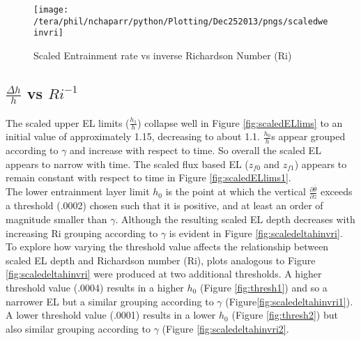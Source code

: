 \begin{figure}[htbp]
\centering
       \texttt{[image: /tera/phil/nchaparr/python/Plotting/Dec252013/pngs/scaledweinvri]}
       
        \caption{Scaled Entrainment rate vs inverse Richardson Number (\acs{Ri})}
        \label{fig:scaledweinvri}
\end{figure}

\clearpage

\subsection{$\frac{\Delta h}{h}$ vs $Ri^{-1}$}
\label{subsec:deltahri}
\FloatBarrier

The scaled upper EL limits ($\frac{h_{1}}{h}$) collapse well in Figure \ref{fig:scaledELlims} 
to an initial value of approximately 1.15, decreasing to about 1.1.  $\frac{h_{0}}{h}$s appear 
grouped according to $\gamma$ and increase with respect to time.  So overall the scaled \acs{EL} appears
to narrow with time.   The scaled flux based \acs{EL} ($z_{f0}$ and $z_{f1}$) appears to remain constant 
with respect to time in Figure \ref{fig:scaledELlims1}.\\

The lower entrainment layer limit $h_{0}$ is the point at which the vertical 
$\frac{\partial \overline{\theta}}{\partial z}$ exceeds a threshold (.0002) chosen such that
it is positive, and at least an order of magnitude smaller than $\gamma$.   Although the resulting 
scaled \acs{EL} depth decreases with increasing \acs{Ri} grouping according to $\gamma$ is evident 
in Figure \ref{fig:scaledeltahinvri}.\\

To explore how varying the threshold value affects the relationship between scaled \acs{EL} depth
and Richardson number (\acs{Ri}), plots analogous to Figure \ref{fig:scaledeltahinvri} were produced at two 
additional thresholds.  A higher threshold value (.0004) results in a higher $h_{0}$ (Figure \ref{fig:thresh1})   
and so a narrower \acs{EL} but a similar grouping according to $\gamma$ (Figure\ref{fig:scaledeltahinvri1}).
A lower threshold value (.0001) results in a lower $h_{0}$ (Figure \ref{fig:thresh2})
but also similar grouping according to $\gamma$ (Figure \ref{fig:scaledeltahinvri2}.\\

